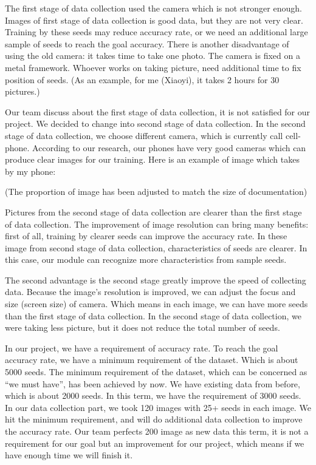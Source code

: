 \documentclass[onecolumn, draftclsnofoot,10pt, compsoc]{IEEEtran}
\begin{document}
The first stage of data collection used the camera which is not stronger enough. Images of first stage of data collection is good data, but they are not very clear. Training by these seeds may reduce accuracy rate, or we need an additional large sample of seeds to reach the goal accuracy. There is another disadvantage of using the old camera: it takes time to take one photo. The camera is fixed on a metal framework. Whoever works on taking picture, need additional time to fix position of seeds. (As an example, for me (Xiaoyi), it takes 2 hours for 30 pictures.)

Our team discuss about the first stage of data collection, it is not satisfied for our project. We decided to change into second stage of data collection. In the second stage of data collection, we choose different camera, which is currently call cell-phone. According to our research, our phones have very good cameras which can produce clear images for our training. Here is an example of image which takes by my phone:

(The proportion of image has been adjusted to match the size of documentation)

Pictures from the second stage of data collection are clearer than the first stage of data collection. The improvement of image resolution can bring many benefits: first of all, training by clearer seeds can improve the accuracy rate. In these image from second stage of data collection, characteristics of seeds are clearer. In this case, our module can recognize more characteristics from sample seeds.

The second advantage is the second stage greatly improve the speed of collecting data. Because the image’s resolution is improved, we can adjust the focus and size (screen size) of camera. Which means in each image, we can have more seeds than the first stage of data collection. In the second stage of data collection, we were taking less picture, but it does not reduce the total number of seeds.

In our project, we have a requirement of accuracy rate. To reach the goal accuracy rate, we have a minimum requirement of the dataset. Which is about 5000 seeds. The minimum requirement of the dataset, which can be concerned as “we must have”, has been achieved by now. We have existing data from before, which is about 2000 seeds. In this term, we have the requirement of 3000 seeds. In our data collection part, we took 120 images with 25+ seeds in each image. We hit the minimum requirement, and will do additional data collection to improve the accuracy rate. Our team perfects 200 image as new data this term, it is not a requirement for our goal but an improvement for our project, which means if we have enough time we will finish it.
\end{document}
